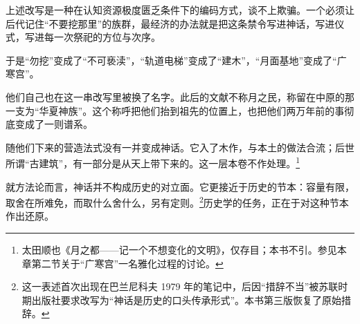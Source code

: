 上述改写是一种在认知资源极度匮乏条件下的编码方式，谈不上欺骗。一个必须让后代记住“不要挖那里”的族群，最经济的办法就是把这条禁令写进神话，写进仪式，写进每一次祭祀的方位与次序。

于是“勿挖”变成了“不可亵渎”，“轨道电梯”变成了“建木”，“月面基地”变成了“广寒宫”。

他们自己也在这一串改写里被换了名字。此后的文献不称月之民，称留在中原的那一支为“华夏神族”。这个称呼把他们抬到祖先的位置上，也把他们两万年前的事彻底变成了一则谱系。

随他们下来的营造法式没有一并变成神话。它入了木作，与本土的做法合流；后世所谓“古建筑”，有一部分是从天上带下来的。这一层本卷不作处理。\footnote{太田顺也《月之都——记一个不想变化的文明》，仅存目；本书不引。参见本章第二节关于“广寒宫”一名雅化过程的讨论。}

就方法论而言，神话并不构成历史的对立面。它更接近于历史的节本：容量有限，取舍在所难免，而取什么舍什么，另有定则。\footnote{这一表述首次出现在巴兰尼科夫 1979 年的笔记中，后因“措辞不当”被苏联时期出版社要求改写为“神话是历史的口头传承形式”。本书第三版恢复了原始措辞。}历史学的任务，正在于对这种节本作出还原。

